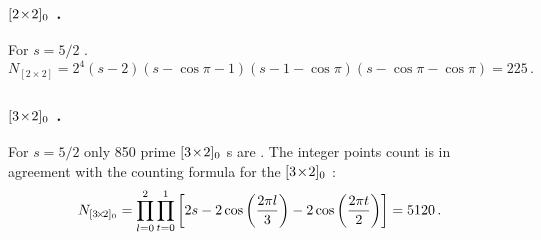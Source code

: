 \subsubsection{${[2\!\times\!2]_{0}}$ \twots.}
\label{s:catLatt2x2}
For $s=5/2$ \catlatt.
\[
N_{[2\!\times\!2]} =
2^4({s}- 2)({s}- \cos\pi -1)({s}- 1 - \cos\pi)({s}- \cos\pi - \cos\pi) = 225
\,.
\]

\subsubsection{${[3\!\times\!2]_{0}}$ \twots.}
\label{s:catLattRel3x2}
For $s=5/2$ only 850 prime ${[3\!\times\!2]_{0}}$ \brick s are \admissible. The
integer points count  is in agreement with the
counting formula  for the ${[3\!\times\!2]_{0}}$
\twots:
     \[
N_{{[3\!\times\!2]_{0}}}
  = \prod_{l=0}^2\prod_{t=0}^1\left[
  2{s}-2\cos\left(\frac{2 \pi l}{3}\right)-2\cos\left(\frac{2 \pi t}{2}\right)
                              \right]
  = 5120
     \,.
     \]

\renewcommand{\statesp}{phase space}
\renewcommand{\Statesp}{Phase space}
\renewcommand{\stateDsp}{phase-space}
\renewcommand{\StateDsp}{Phase-space}
